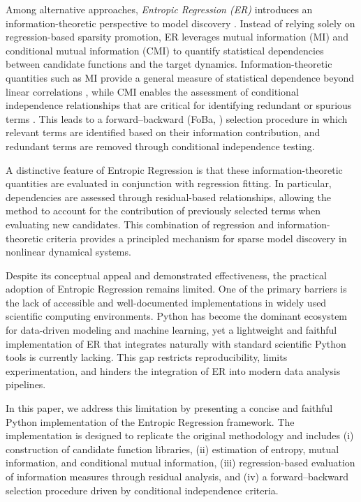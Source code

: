\documentclass[11pt]{article}
\begin{document}
Among alternative approaches, \emph{Entropic Regression (ER)} introduces an information-theoretic perspective to model discovery \cite{almomani2020entropic}. Instead of relying solely on regression-based sparsity promotion, ER leverages mutual information (MI) and conditional mutual information (CMI) to quantify statistical dependencies between candidate functions and the target dynamics. Information-theoretic quantities such as MI provide a general measure of statistical dependence beyond linear correlations \cite{cover2006elements}, while CMI enables the assessment of conditional independence relationships that are critical for identifying redundant or spurious terms \cite{runge2019detecting}. This leads to a forward–backward (FoBa, \cite{zhang2008adaptive}) selection procedure in which relevant terms are identified based on their information contribution, and redundant terms are removed through conditional independence testing.

A distinctive feature of Entropic Regression is that these information-theoretic quantities are evaluated in conjunction with regression fitting. In particular, dependencies are assessed through residual-based relationships, allowing the method to account for the contribution of previously selected terms when evaluating new candidates. This combination of regression and information-theoretic criteria provides a principled mechanism for sparse model discovery in nonlinear dynamical systems.

Despite its conceptual appeal and demonstrated effectiveness, the practical adoption of Entropic Regression remains limited. One of the primary barriers is the lack of accessible and well-documented implementations in widely used scientific computing environments. Python has become the dominant ecosystem for data-driven modeling and machine learning, yet a lightweight and faithful implementation of ER that integrates naturally with standard scientific Python tools is currently lacking. This gap restricts reproducibility, limits experimentation, and hinders the integration of ER into modern data analysis pipelines.

In this paper, we address this limitation by presenting a concise and faithful Python implementation of the Entropic Regression framework. The implementation is designed to replicate the original methodology and includes (i) construction of candidate function libraries, (ii) estimation of entropy, mutual information, and conditional mutual information, (iii) regression-based evaluation of information measures through residual analysis, and (iv) a forward–backward selection procedure driven by conditional independence criteria.
\end{document}
